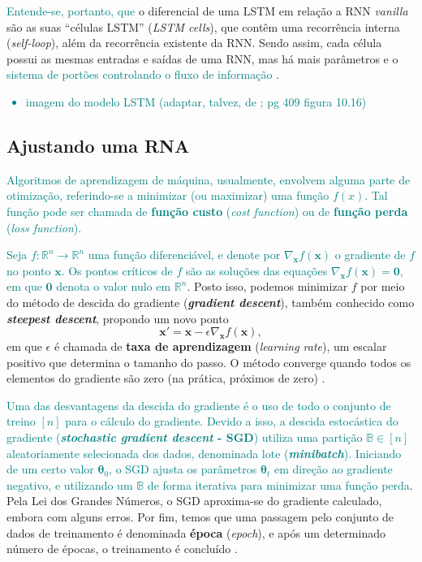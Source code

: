 \documentclass{automatextcc}
\newcommand{\nico}[1]{\textcolor{teal}{#1}}
\newcommand{\R}{\mathds{R}}
\newcommand{\B}{\mathds{B}}
\newcommand{\bs}[1]{\boldsymbol{#1}}
\begin{document}
\nico{Entende-se, portanto, que} o diferencial de uma LSTM em relação a RNN \textit{vanilla} são as suas ``células LSTM'' (\textit{LSTM cells}), que contêm uma recorrência interna (\textit{self-loop}), além da recorrência existente da RNN. Sendo assim, cada célula possui as mesmas entradas e saídas de uma RNN, mas há mais parâmetros e o \nico{sistema de portões controlando o fluxo de informação} \citep{goodfellow2016}.

\nico{
\begin{itemize}
    \item imagem do modelo LSTM (adaptar, talvez, de \citet{goodfellow2016}; pg 409 figura 10.16)
\end{itemize}
}



\subsection{Ajustando uma RNA}
\nico{
Algoritmos de aprendizagem de máquina, usualmente, envolvem alguma parte de otimização, referindo-se a minimizar (ou maximizar) uma função $f(x)$. Tal função pode ser chamada de \textbf{função custo} (\textit{cost function}) ou de \textbf{função perda} (\textit{loss function}). 
}

\nico{Seja $f: \R^n \rightarrow \R^n$ uma função diferenciável, e denote por $\nabla_{\bs{x}} f(\bs{x})$ o gradiente de $f$ no ponto $\bs{x}$. Os pontos críticos de $f$ são as soluções das equações $\nabla_{\bs{x}} f(\bs{x}) = \bs{0}$, em que $\bs{0}$ denota o valor nulo em $\R^n$}. Posto isso, podemos minimizar $f$ por meio do método de descida do gradiente (\textit{\textbf{gradient descent}}), também conhecido como \textit{\textbf{steepest descent}}, propondo um novo ponto
\begin{equation*}
    \bs{x'} = \bs{x} - \epsilon \nabla_{\bs{x}} f(\bs{x}),
\end{equation*}
em que $\epsilon$ é chamada de \textbf{taxa de aprendizagem} (\textit{learning rate}), um escalar positivo que determina o tamanho do passo. O método converge quando todos os elementos do gradiente são zero (na prática, próximos de zero) \citep{goodfellow2016}. 

\nico{Uma das desvantagens da descida do gradiente é o uso de todo o conjunto de treino $[n]$ para o cálculo do gradiente. Devido a isso, a descida estocástica do gradiente (\textbf{\textit{stochastic gradient descent} - SGD}) utiliza uma partição $\B \in [n]$ aleatoriamente selecionada dos dados, denominada lote (\textbf{\textit{minibatch}}). Iniciando de um certo valor $\bs{\theta}_0$, o SGD ajusta os parâmetros $\bs{\theta}_t$ em direção ao gradiente negativo, e utilizando um $\B$ de forma iterativa para minimizar uma função perda}. Pela Lei dos Grandes Números, o SGD aproxima-se do gradiente calculado, embora com alguns erros. Por fim, temos que uma passagem pelo conjunto de dados de treinamento é denominada \textbf{época} (\textit{epoch}), e após um determinado número de épocas, o treinamento é concluído \citep{goodfellow2016, kamath2019, fan2021}. 
\end{document}
